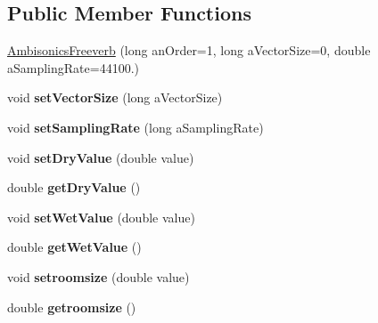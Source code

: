 \subsection*{Public Member Functions}
\begin{DoxyCompactItemize}
\item 
\hyperlink{class_ambisonics_freeverb_a837e51d85f2a237e7957b6534f3bde1c}{Ambisonics\-Freeverb} (long an\-Order=1, long a\-Vector\-Size=0, double a\-Sampling\-Rate=44100.)
\item 
\hypertarget{class_ambisonics_freeverb_ae24ef9862b22f3331439d56787989d76}{void {\bfseries set\-Vector\-Size} (long a\-Vector\-Size)}\label{class_ambisonics_freeverb_ae24ef9862b22f3331439d56787989d76}

\item 
\hypertarget{class_ambisonics_freeverb_a49ab3c3025eb3fea13f64d9c5ed7bbf3}{void {\bfseries set\-Sampling\-Rate} (long a\-Sampling\-Rate)}\label{class_ambisonics_freeverb_a49ab3c3025eb3fea13f64d9c5ed7bbf3}

\item 
\hypertarget{class_ambisonics_freeverb_a19d9642bd8f4543c2c35c1e042afb1d6}{void {\bfseries set\-Dry\-Value} (double value)}\label{class_ambisonics_freeverb_a19d9642bd8f4543c2c35c1e042afb1d6}

\item 
\hypertarget{class_ambisonics_freeverb_ad6519125e7988f86e8c6dfe0a26f40be}{double {\bfseries get\-Dry\-Value} ()}\label{class_ambisonics_freeverb_ad6519125e7988f86e8c6dfe0a26f40be}

\item 
\hypertarget{class_ambisonics_freeverb_afa6ee85862adee6cda7b8d4bc66c6d45}{void {\bfseries set\-Wet\-Value} (double value)}\label{class_ambisonics_freeverb_afa6ee85862adee6cda7b8d4bc66c6d45}

\item 
\hypertarget{class_ambisonics_freeverb_ade6ec143af545f0c48c96d36bd53f6d6}{double {\bfseries get\-Wet\-Value} ()}\label{class_ambisonics_freeverb_ade6ec143af545f0c48c96d36bd53f6d6}

\item 
\hypertarget{class_ambisonics_freeverb_a095ff6d6cdd6fb6547bff5dd3fe7c969}{void {\bfseries setroomsize} (double value)}\label{class_ambisonics_freeverb_a095ff6d6cdd6fb6547bff5dd3fe7c969}

\item 
\hypertarget{class_ambisonics_freeverb_ad4850b43cdbf06e4162aee8cba6e4e23}{double {\bfseries getroomsize} ()}\label{class_ambisonics_freeverb_ad4850b43cdbf06e4162aee8cba6e4e23}


\end{DoxyCompactItemize}
